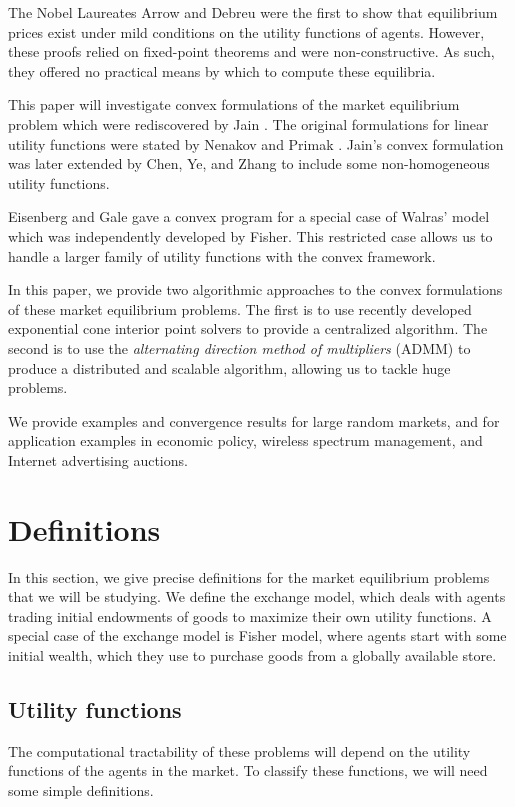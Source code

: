 \documentclass[12pt]{article}
\begin{document}
The Nobel Laureates Arrow and Debreu were the first to show that equilibrium
prices exist under mild conditions on the utility functions of agents\cite{arrow1954existence}.
However, these proofs relied on fixed-point theorems and were non-constructive.
As such, they offered no practical means by which to compute these equilibria.

This paper will investigate convex formulations of the market
equilibrium problem which were rediscovered by Jain \cite{jain2007polynomial}.
The original formulations for linear utility functions
were stated by Nenakov and Primak \cite{nenakov1983algorithm}.
Jain's convex formulation was later extended by Chen, Ye, and Zhang \cite{chen2007note, chen2010equilibrium} to include some non-homogeneous
utility functions.

Eisenberg and Gale \cite{eisenberg1959consensus, gale1960theory, eisenberg1961aggregation} gave a convex program for a special case of Walras' model which was independently developed by Fisher. %
This restricted case allows us to handle a larger family of utility functions
with the convex framework.

In this paper, we provide two algorithmic approaches to the convex formulations of these market equilibrium problems. The first is to use recently developed exponential cone interior point solvers to provide a centralized algorithm. The second is to use the \emph{alternating direction method of multipliers} (ADMM) \cite{boyd2011distributed} to produce a distributed and scalable algorithm, allowing us to tackle huge problems.

We provide examples and convergence results for large random markets, and 
for application examples in economic policy, wireless spectrum management,
and Internet advertising auctions.

\section{Definitions}
In this section, we give precise definitions for the market equilibrium problems that we will be studying. We define the exchange model,
which deals with agents trading initial endowments of goods to maximize their own utility functions.
A special case of the exchange model is Fisher model, where agents
start with some initial wealth, which they use to purchase goods 
from a globally available store.

\subsection{Utility functions}
The computational tractability of these problems will depend on the
utility functions of the agents in the market.
To classify these functions, we will need some simple definitions.
\end{document}
